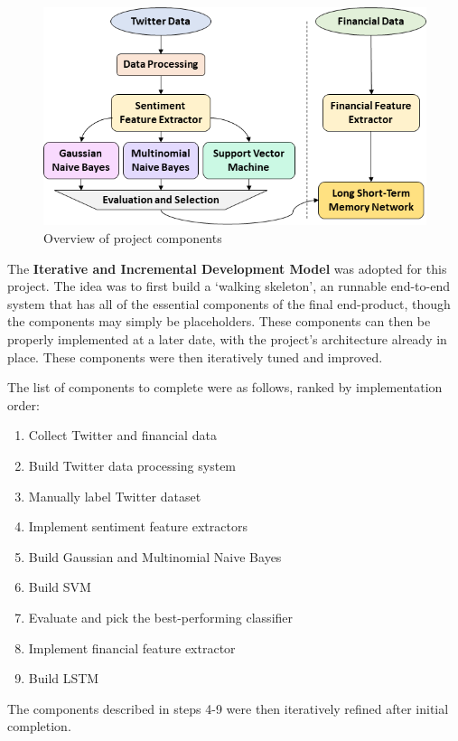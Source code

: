 \documentclass[12pt,a4paper,twoside,openright]{report}
\begin{document}
\begin{figure}[H]
\centering
\vspace{10pt}
\includegraphics[width=\textwidth]{Proj_Overview.png}
\caption{Overview of project components}
\label{fig:overview}
\end{figure}

The \textbf{Iterative and Incremental Development Model} was adopted for this project.
The idea was to first build a `walking skeleton', an runnable end-to-end system that
has all of the essential components of the final end-product, though the components
may simply be placeholders\cite{Cockburn04}. These components can then be properly
implemented at a later date, with the project's architecture already in place.
These components were then iteratively tuned and improved.

The list of components to complete were as follows, ranked by implementation order:

\begin{enumerate}
\item
Collect Twitter and financial data

\item
Build Twitter data processing system

\item
Manually label Twitter dataset

\item
Implement sentiment feature extractors

\item
Build Gaussian and Multinomial Naive Bayes

\item
Build SVM

\item
Evaluate and pick the best-performing classifier

\item
Implement financial feature extractor

\item
Build LSTM
\end{enumerate}
The components described in steps 4-9 were then iteratively refined after initial completion.
\end{document}
